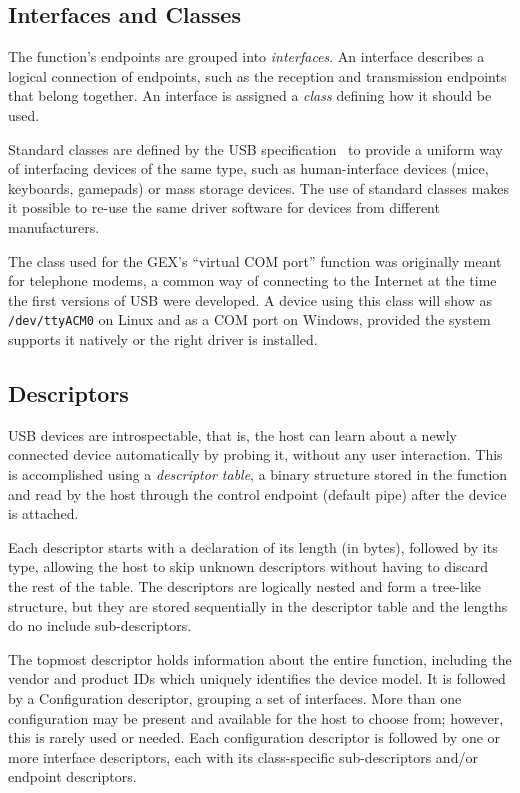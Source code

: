 \subsection{Interfaces and Classes}

The function's endpoints are grouped into \textit{interfaces}. An interface describes a logical connection of endpoints, such as the reception and transmission endpoints that belong together. An interface is assigned a \textit{class} defining how it should be used.

Standard classes are defined by the USB specification~\cite{usb-class-list} to provide a uniform way of interfacing devices of the same type, such as human-interface devices (mice, keyboards, gamepads) or mass storage devices. The use of standard classes makes it possible to re-use the same driver software for devices from different manufacturers.

The class used for the GEX's ``virtual COM port'' function was originally meant for telephone modems, a common way of connecting to the Internet at the time the first versions of USB were developed. A device using this class will show as \verb|/dev/ttyACM0| on Linux and as a COM port on Windows, provided the system supports it natively or the right driver is installed.

\subsection{Descriptors}

USB devices are introspectable, that is, the host can learn about a newly connected device automatically by probing it, without any user interaction. This is accomplished using a \textit{descriptor table}, a binary structure stored in the function and read by the host through the control endpoint (default pipe) after the device is attached.

Each descriptor starts with a declaration of its length (in bytes), followed by its type,  allowing the host to skip unknown descriptors without having to discard the rest of the table. The descriptors are logically nested and form a tree-like structure, but they are stored sequentially in the descriptor table and the lengths do no include sub-descriptors.

The topmost descriptor holds information about the entire function, including the vendor and product IDs which uniquely identifies the device model. It is followed by a Configuration descriptor, grouping a set of interfaces. More than one configuration may be present and available for the host to choose from; however, this is rarely used or needed. Each configuration descriptor is followed by one or more interface descriptors, each with its class-specific sub-descriptors and/or endpoint descriptors.

